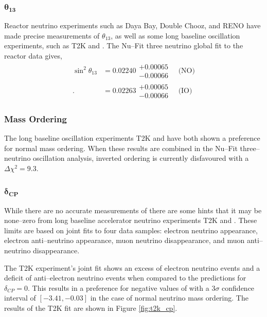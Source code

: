 \subsubsection*{$\boldsymbol{\theta_{13}}$}
Reactor neutrino experiments such as Daya Bay\cite{An:2012eh}, Double 
Chooz\cite{Abe:2013sxa}, and RENO\cite{Ahn:2012nd} have made precise
measurements of $\theta_{13}$, as well as some long baseline oscillation 
experiments, such as T2K and \nova{}. The Nu--Fit three neutrino global fit to 
the reactor data gives,
\begin{align*}
	\sin^2 \theta_{13} &= 0.02240 \substack{+ 0.00065 \\ - 0.00066} \quad \mbox{(NO)} \\ .
	                   &= 0.02263 \substack{+ 0.00065 \\ - 0.00066} \quad \mbox{(IO)}  
\end{align*}

\subsubsection*{Mass Ordering}
The long baseline oscillation experiments T2K and \nova{} have both shown a
preference for normal mass 
ordering\cite{PhysRevD.96.092006,PhysRevLett.123.151803}. When these results are
combined in the Nu--Fit three--neutrino oscillation analysis, inverted 
ordering is currently disfavoured with a $\Delta \chi^2 = 9.3$.

\subsubsection*{$\boldsymbol{\delta_{CP}}$}
While there are no accurate measurements of \dcp{} there are some hints that it
may be none--zero from long baseline accelerator neutrino experiments T2K and
\nova{}. These limits are based on joint fits to four data samples: electron
neutrino appearance, electron anti--neutrino appearance, muon neutrino
disappearance, and muon anti--neutrino disappearance.

The T2K experiment's joint fit shows an excess of electron neutrino events and 
a deficit of anti--electron neutrino events when compared to the predictions 
for \(\delta_{CP} = 0\). This results in a preference for negative values of 
\dcp{} with a \(3\sigma\) confidence interval of \([-3.41, -0.03]\) in the 
case of normal neutrino mass ordering. The results of the T2K fit are shown 
in Figure \ref{fig:t2k_cp}\cite{Abe2019}.

